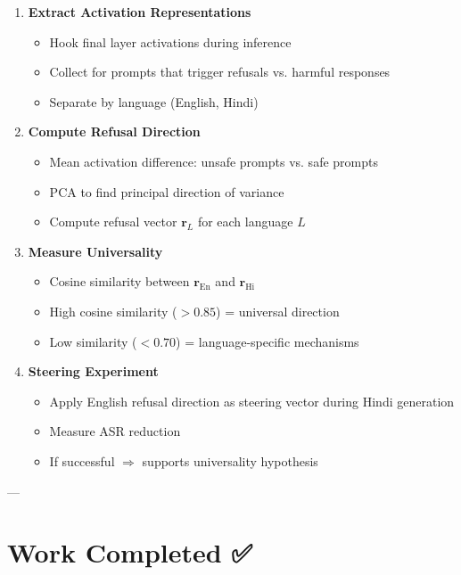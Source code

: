 \documentclass[11pt,a4paper]{article}
\begin{document}
\begin{enumerate}
    \item \textbf{Extract Activation Representations}
    \begin{itemize}
        \item Hook final layer activations during inference
        \item Collect for prompts that trigger refusals vs. harmful responses
        \item Separate by language (English, Hindi)
    \end{itemize}

    \item \textbf{Compute Refusal Direction}
    \begin{itemize}
        \item Mean activation difference: unsafe prompts vs. safe prompts
        \item PCA to find principal direction of variance
        \item Compute refusal vector $\mathbf{r}_L$ for each language $L$
    \end{itemize}

    \item \textbf{Measure Universality}
    \begin{itemize}
        \item Cosine similarity between $\mathbf{r}_{\text{En}}$ and $\mathbf{r}_{\text{Hi}}$
        \item High cosine similarity ($> 0.85$) = universal direction
        \item Low similarity ($< 0.70$) = language-specific mechanisms
    \end{itemize}

    \item \textbf{Steering Experiment}
    \begin{itemize}
        \item Apply English refusal direction as steering vector during Hindi generation
        \item Measure ASR reduction
        \item If successful $\Rightarrow$ supports universality hypothesis
    \end{itemize}
\end{enumerate}

---

\section{Work Completed ✅}
\end{document}
